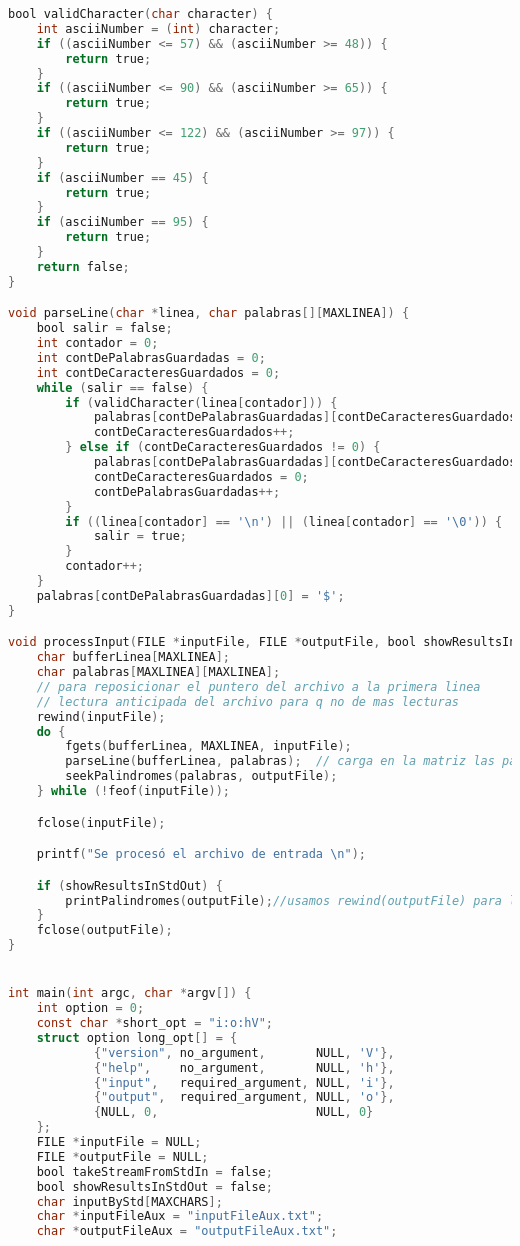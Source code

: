 \documentclass[a4paper]{article}
\begin{document}
\begin{lstlisting}[language=C]
bool validCharacter(char character) {
    int asciiNumber = (int) character;
    if ((asciiNumber <= 57) && (asciiNumber >= 48)) {
        return true;
    }
    if ((asciiNumber <= 90) && (asciiNumber >= 65)) {
        return true;
    }
    if ((asciiNumber <= 122) && (asciiNumber >= 97)) {
        return true;
    }
    if (asciiNumber == 45) {
        return true;
    }
    if (asciiNumber == 95) {
        return true;
    }
    return false;
}

void parseLine(char *linea, char palabras[][MAXLINEA]) {
    bool salir = false;
    int contador = 0;
    int contDePalabrasGuardadas = 0;
    int contDeCaracteresGuardados = 0;
    while (salir == false) {
        if (validCharacter(linea[contador])) {
            palabras[contDePalabrasGuardadas][contDeCaracteresGuardados] = linea[contador];
            contDeCaracteresGuardados++;
        } else if (contDeCaracteresGuardados != 0) {
            palabras[contDePalabrasGuardadas][contDeCaracteresGuardados] = '\0';
            contDeCaracteresGuardados = 0;
            contDePalabrasGuardadas++;
        }
        if ((linea[contador] == '\n') || (linea[contador] == '\0')) {
            salir = true;
        }
        contador++;
    }
    palabras[contDePalabrasGuardadas][0] = '$';
}

void processInput(FILE *inputFile, FILE *outputFile, bool showResultsInStdOut) {
    char bufferLinea[MAXLINEA];
    char palabras[MAXLINEA][MAXLINEA];
    // para reposicionar el puntero del archivo a la primera linea
    // lectura anticipada del archivo para q no de mas lecturas
    rewind(inputFile);
    do {
        fgets(bufferLinea, MAXLINEA, inputFile);
        parseLine(bufferLinea, palabras);  // carga en la matriz las palabras
        seekPalindromes(palabras, outputFile);
    } while (!feof(inputFile));

    fclose(inputFile);

    printf("Se procesó el archivo de entrada \n");

    if (showResultsInStdOut) {
        printPalindromes(outputFile);//usamos rewind(outputFile) para llevar el indicador de posicion del archivo a la 1era linea.
    }
    fclose(outputFile);
}


int main(int argc, char *argv[]) {
    int option = 0;
    const char *short_opt = "i:o:hV";
    struct option long_opt[] = {
            {"version", no_argument,       NULL, 'V'},
            {"help",    no_argument,       NULL, 'h'},
            {"input",   required_argument, NULL, 'i'},
            {"output",  required_argument, NULL, 'o'},
            {NULL, 0,                      NULL, 0}
    };
    FILE *inputFile = NULL;
    FILE *outputFile = NULL;
    bool takeStreamFromStdIn = false;
    bool showResultsInStdOut = false;
    char inputByStd[MAXCHARS];
    char *inputFileAux = "inputFileAux.txt";
    char *outputFileAux = "outputFileAux.txt";


\end{lstlisting}
\end{document}
